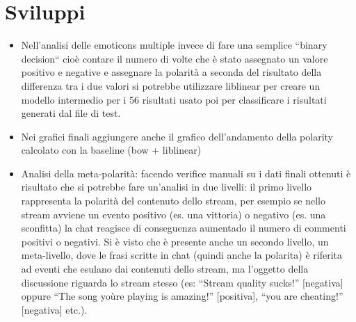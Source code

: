 \documentclass[a4paper,12pt,openright,twoside]{report}
\theoremstyle{definition}
\begin{document}
\chapter{Sviluppi}
\label{ch:sviluppi}
\begin{itemize}
\item Nell'analisi delle emoticons multiple invece di fare una semplice ``binary decision`` cioè contare il numero di volte che è stato assegnato un valore positivo e negative e assegnare la polarità a seconda del risultato della differenza tra i due valori si potrebbe utilizzare liblinear per creare un modello intermedio per i 56 risultati usato poi per classificare i risultati generati dal file di test.
\item Nei grafici finali aggiungere anche il grafico dell'andamento della polarity calcolato con la baseline (bow + liblinear)
\item Analisi della meta-polarità: facendo verifice manuali su i dati finali ottenuti è risultato che si potrebbe fare un'analisi in due livelli: il primo livello rappresenta la polarità del contenuto dello stream, per esempio se nello stream avviene un evento positivo (es. una vittoria) o negativo (es. una sconfitta) la chat reagisce di conseguenza aumentado il numero di commenti positivi o negativi.
Si è visto che è presente anche un secondo livello, un meta-livello, dove le frasi scritte in chat (quindi anche la polarita) è riferita ad eventi che esulano dai contenuti dello stream, ma l'oggetto della discussione riguarda lo stream stesso (es: ``Stream quality sucks!'' [negativa] oppure ``The song yoùre playing is amazing!'' [positiva], ``you are cheating!'' [negativa] etc.).
\end{itemize}
\end{document}
